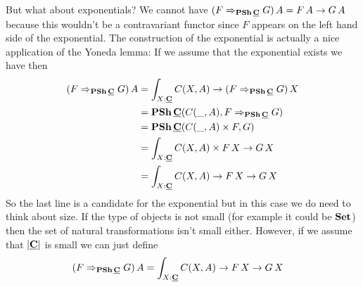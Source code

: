 But what about exponentials? We cannot have $(\expC{\PSh\,\cat{C}}{F}{G})\,A = F\,A \to G\,A$ because this wouldn't be a contravariant functor since $F$ appears on the left hand side of the exponential. The construction of the exponential is actually a nice application of the Yoneda lemma: 
If we assume that the exponential exists we have then 
\begin{align*}
(\expC{\PSh\,\cat{C}}{F}{G})\,A 
& = \int_{X:\cat{C}}C(X,A) \to (\expC{\PSh\,\cat{C}}{F}{G})\,X \\
& = \PSh\,\cat{C}(C(\_,A),\expC{\PSh\,\cat{C}}{F}{G}) \\
& = \PSh\,\cat{C}(C(\_,A) \times F,G) \\
& = \int_{X:\cat{C}}C(X,A)\times F\,X \to G\,X\\
& = \int_{X:\cat{C}}C(X,A)\to F\,X \to G\,X
\end{align*}
So the last line is a candidate for the exponential but in this case we do need to think about size. If the type of objects is not small (for example it could be $\Set$) then the set of natural transformations isn't small either. However, if we assume that $\obj{\cat{C}}$ is small we can just define
\begin{align*}
(\expC{\PSh\,\cat{C}}{F}{G})\,A & = \int_{X:\cat{C}}C(X,A)\to F\,X \to G\,X
\end{align*}
